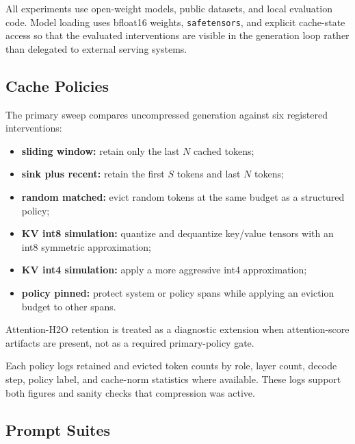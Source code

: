 \documentclass[11pt]{article}
\begin{document}
All experiments use open-weight models, public datasets, and local evaluation code. Model loading uses bfloat16 weights, \texttt{safetensors}, and explicit cache-state access so that the evaluated interventions are visible in the generation loop rather than delegated to external serving systems.

\subsection{Cache Policies}

The primary sweep compares uncompressed generation against six registered interventions:
\begin{itemize}
  \item \textbf{sliding window:} retain only the last $N$ cached tokens;
  \item \textbf{sink plus recent:} retain the first $S$ tokens and last $N$ tokens;
  \item \textbf{random matched:} evict random tokens at the same budget as a structured policy;
  \item \textbf{KV int8 simulation:} quantize and dequantize key/value tensors with an int8 symmetric approximation;
  \item \textbf{KV int4 simulation:} apply a more aggressive int4 approximation;
  \item \textbf{policy pinned:} protect system or policy spans while applying an eviction budget to other spans.
\end{itemize}
Attention-H2O retention is treated as a diagnostic extension when attention-score artifacts are present, not as a required primary-policy gate.

Each policy logs retained and evicted token counts by role, layer count, decode step, policy label, and cache-norm statistics where available. These logs support both figures and sanity checks that compression was active.

\subsection{Prompt Suites}
\end{document}

